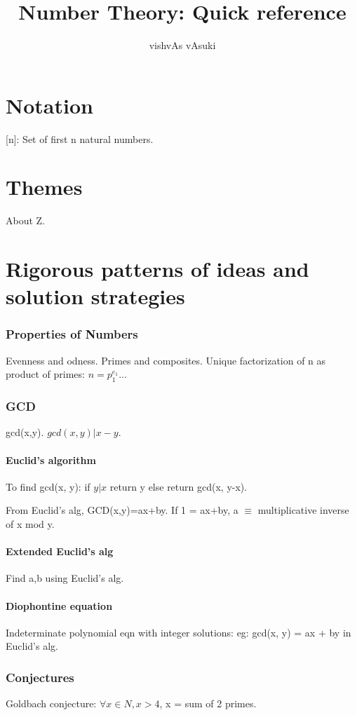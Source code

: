 \documentclass[10pt]{amsart}
\title{Number Theory: Quick reference}
\author{vishvAs vAsuki}
\begin{document}
\maketitle
\tableofcontents

\part{Notation}
[n]: Set of first n natural numbers.

\part{Themes}
About Z.

\part{Rigorous patterns of ideas and solution strategies}

\section{Properties of Numbers}
Evenness and odness. Primes and composites. Unique factorization of n as product of primes: $n=p_{1}^{e_{1}} ..$.

\section{GCD}
gcd(x,y). $gcd(x, y) |x-y$.

\subsection{Euclid's algorithm}
To find gcd(x, y): if $y|x$ return y else return gcd(x, y-x).

From Euclid's alg, GCD(x,y)=ax+by. If 1 = ax+by, a $\equiv$ multiplicative inverse of x mod y.

\subsection{Extended Euclid's alg}
Find a,b using Euclid's alg.

\subsection{Diophontine equation}
Indeterminate polynomial eqn with integer solutions: eg: gcd(x, y) = ax + by in Euclid's alg.

\section{Conjectures}
Goldbach conjecture: $\forall x \in N, x>4$, x = sum of 2 primes.
\end{document}
